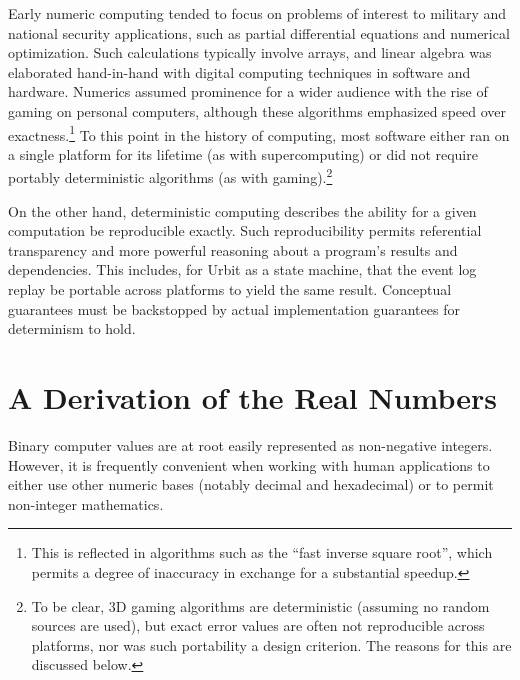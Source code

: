 \documentclass[twoside]{article}
\begin{document}
Early numeric computing tended to focus on problems of interest to military and national security applications, such as partial differential equations and numerical optimization.  Such calculations typically involve arrays, and linear algebra was elaborated hand-in-hand with digital computing techniques in software and hardware.  Numerics assumed prominence for a wider audience with the rise of gaming on personal computers, although these algorithms emphasized speed over exactness.\footnote{This is reflected in algorithms such as the “fast inverse square root”, which permits a degree of inaccuracy in exchange for a substantial speedup.}  To this point in the history of computing, most software either ran on a single platform for its lifetime (as with supercomputing) or did not require portably deterministic algorithms (as with gaming).\footnote{To be clear, 3D gaming algorithms are deterministic (assuming no random sources are used), but exact error values are often not reproducible across platforms, nor was such portability a design criterion.  The reasons for this are discussed below.}

On the other hand, deterministic computing describes the ability for a given computation be reproducible exactly.  Such reproducibility permits referential transparency and more powerful reasoning about a program's results and dependencies.  This includes, for Urbit as a state machine, that the event log replay be portable across platforms to yield the same result.  Conceptual guarantees must be backstopped by actual implementation guarantees for determinism to hold.

\section{A Derivation of the Real Numbers}

Binary computer values are at root easily represented as non-negative integers.  However, it is frequently convenient when working with human applications to either use other numeric bases (notably decimal and hexadecimal) or to permit non-integer mathematics.
\end{document}
